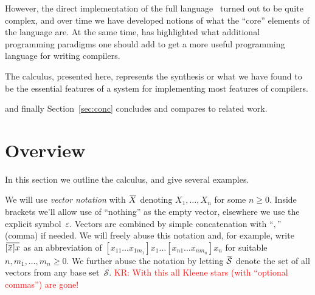 \documentclass[letterpaper,11pt]{article}
\newcommand{\KR}[1]{\textcolor{red}{KR: #1}}
\begin{document}
However, the direct implementation of the full \CRSX language~\cite{crsx} turned out to be quite
complex, and over time we have developed notions of what the ``core'' elements of the language
are. At the same time, \HAX has highlighted what additional programming paradigms one should add to
get a more useful programming language for writing compilers.


The \hax calculus, presented here, represents the synthesis or what we have found to be the
essential features of a system for implementing most features of compilers.

%
and finally Section~\ref{sec:conc} concludes and compares to related work.


\section{Overview}
\label{sec:overview}

In this section we outline the \hax calculus, and give several examples.

\begin{notation}[vectors]
  We will use \emph{vector notation} with $\ov{X}$ denoting $X_1,…,X_n$ for some $n≥0$. Inside
  brackets we'll allow use of ``nothing'' as the empty vector, elsewhere we use the explicit
  symbol~$ε$.  Vectors are combined by simple concatenation with ``$,$'' (comma) if needed. We will
  freely abuse this notation and, for example, write $\ov{[\ov{x}]x}$ as an abbreviation of
  $[x_{11}…x_{1m_1}]x_1…[x_{n1}…x_{nm_n}]x_n$ for suitable $n,m_1,…,m_n ≥ 0$. We further abuse the
  notation by letting $\ov{\mathcal{S}}$ denote the set of all vectors from any base
  set~$\mathcal{S}$.
  \KR{With this all Kleene stars (with ``optional commas'') are gone!}
\end{notation}
\end{document}
